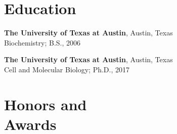 \documentclass[margin,line]{CV}
\begin{document}
\pagestyle{plain}

\begin{resume}




\section{\mysidestyle Education}

\begin{description}[leftmargin=0pt] 
\setlength{\itemsep}{4pt}
\item[] {\bf The University of Texas at Austin}, Austin, Texas \\Biochemistry; B.S., 2006
\item[] {\bf The University of Texas at Austin}, Austin, Texas \\Cell and Molecular Biology; Ph.D., 2017
\end{description}
    
 \section{\mysidestyle Honors and \\ Awards} 


\end{resume}
\end{document}
